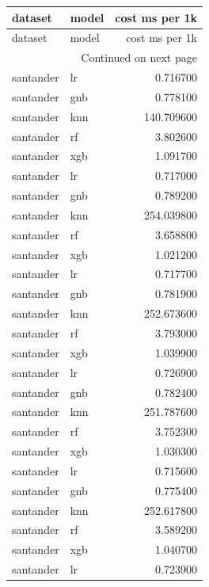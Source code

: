 \begin{center}\label{tab:s2cost}\end{center}
\begingroup\scriptsize\setlength{\tabcolsep}{2.5pt}
\begin{longtable}{llr}
\toprule
dataset & model & cost ms per 1k \\
\midrule
\endfirsthead
\toprule
dataset & model & cost ms per 1k \\
\midrule
\endhead
\midrule
\multicolumn{3}{r}{Continued on next page} \\
\midrule
\endfoot
\bottomrule
\endlastfoot
santander & lr & 0.716700 \\
santander & gnb & 0.778100 \\
santander & knn & 140.709600 \\
santander & rf & 3.802600 \\
santander & xgb & 1.091700 \\
santander & lr & 0.717000 \\
santander & gnb & 0.789200 \\
santander & knn & 254.039800 \\
santander & rf & 3.658800 \\
santander & xgb & 1.021200 \\
santander & lr & 0.717700 \\
santander & gnb & 0.781900 \\
santander & knn & 252.673600 \\
santander & rf & 3.793000 \\
santander & xgb & 1.039900 \\
santander & lr & 0.726900 \\
santander & gnb & 0.782400 \\
santander & knn & 251.787600 \\
santander & rf & 3.752300 \\
santander & xgb & 1.030300 \\
santander & lr & 0.715600 \\
santander & gnb & 0.775400 \\
santander & knn & 252.617800 \\
santander & rf & 3.589200 \\
santander & xgb & 1.040700 \\
santander & lr & 0.723900 \\

\end{longtable}
